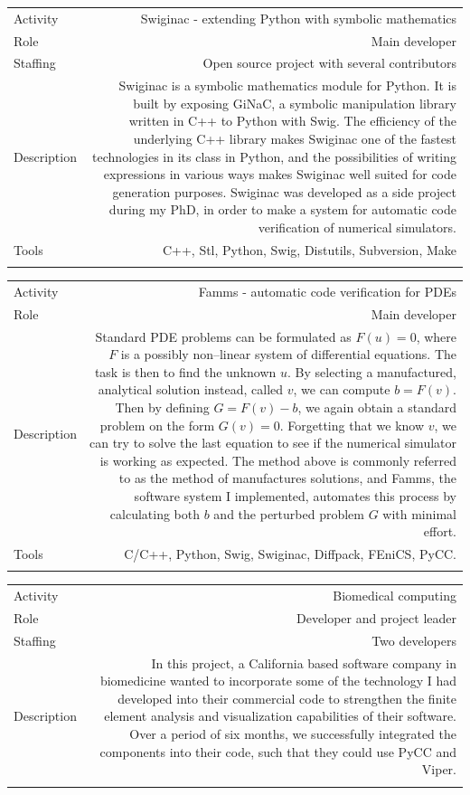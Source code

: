 \documentclass[english,a4paper,11pt]{article}
\begin{document}
\begin{tabular}{@{}LR}
Activity & Swiginac - extending Python with symbolic mathematics\\
Role & Main developer\\
Staffing & Open source project with several contributors\\
Description & Swiginac is a symbolic mathematics module for Python. It is built by exposing GiNaC, a symbolic manipulation library written in C++ to Python with Swig. The efficiency of the underlying C++ library makes Swiginac one of the fastest technologies in its class in Python, and the possibilities of writing expressions in various ways makes Swiginac well suited for code generation purposes. Swiginac was developed as a side project during my PhD, in order to make a system for automatic code verification of numerical simulators.\\
Tools & C++, Stl, Python, Swig, Distutils, Subversion, Make\\ 
\addlinespace \bottomrule[.1pt] \addlinespace
   \end{tabular}

\begin{tabular}{@{}LR}
Activity & Famms - automatic code verification for PDEs\\
Role & Main developer\\
Description & Standard PDE problems can be formulated as $F(u)=0$, where $F$ is a possibly non--linear system of differential equations. The task is then to find the unknown $u$. By selecting a manufactured, analytical solution instead, called $v$, we can compute $b=F(v)$. Then by defining $G = F(v)-b$, we again obtain a standard problem on the form $G(v)=0$. Forgetting that we know $v$, we can try to solve the last equation to see if the numerical simulator is working as expected. The method above is commonly referred to as the method of manufactures solutions, and Famms, the software system I implemented, automates this process by calculating both $b$ and the perturbed problem $G$ with minimal effort.\\
Tools & C/C++, Python, Swig, Swiginac, Diffpack, FEniCS, PyCC.\\ 
\addlinespace \bottomrule[.1pt] \addlinespace
   \end{tabular}

\begin{tabular}{@{}LR}
Activity & Biomedical computing\\
Role & Developer and project leader\\
Staffing & Two developers\\
Description & In this project, a California based software company in biomedicine wanted to incorporate some of the technology I had developed into their commercial code to strengthen the finite element analysis and visualization capabilities of their software. Over a period of six months, we successfully integrated the components into their code, such that they could use PyCC and Viper.\\ 
\addlinespace \bottomrule[.1pt] \addlinespace
   \end{tabular}
\end{document}
